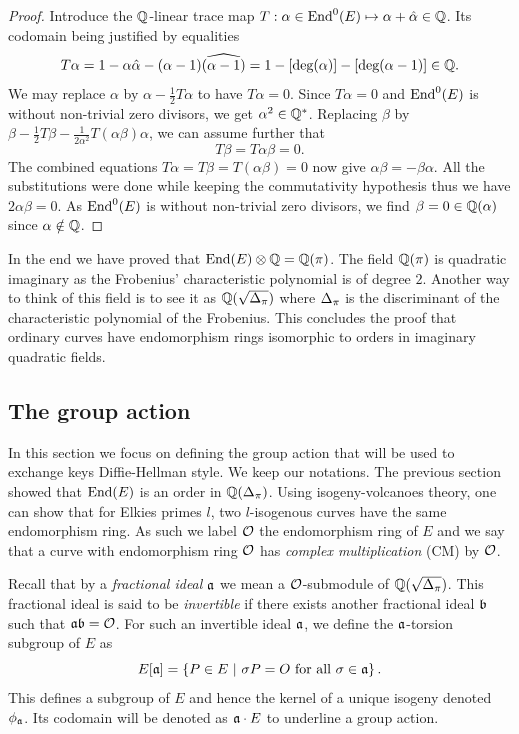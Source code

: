 \documentclass[../main/main.tex]{subfiles}
\begin{document}
\begin{proof}
	Introduce the $\mathbb{Q}$-linear trace map $T:\alpha\in\text{End}^0(E) \mapsto \alpha + \hat{\alpha}\in\mathbb{Q}$.
	Its codomain being justified by equalities
	\[T\alpha = 1 - \alpha\hat{\alpha} -(\alpha-1)\widehat{(\alpha-1)} = 1-[\text{deg}(\alpha)] - [\text{deg}(\alpha-1)]\in\mathbb{Q}.\]
	We may replace $\alpha$ by $\alpha-\frac{1}{2}T\alpha$ to have $T\alpha = 0$.
	Since $T\alpha=0$ and $\text{End}^0(E)$ is without non-trivial zero divisors, we get $\alpha^2\in\mathbb{Q}^{*}$.
	Replacing $\beta$ by $\beta-\frac{1}{2}T\beta-\frac{1}{2\alpha^2}T(\alpha\beta)\alpha$, we can assume further that
	\[
		T\beta = T\alpha\beta = 0.
	\]
	The combined equations $T\alpha=T\beta=T(\alpha\beta)=0$ now give $\alpha\beta = -\beta\alpha$.
	All the substitutions were done while keeping the commutativity hypothesis thus we have $2\alpha\beta=0$.
	As $\text{End}^0(E)$ is without non-trivial zero divisors, we find $\beta=0\in\mathbb{Q}(\alpha)$ since $\alpha\notin\mathbb{Q}$.
\end{proof}
In the end we have proved that $\text{End}(E)\otimes\mathbb{Q} = \mathbb{Q}(\pi)$.
The field $\mathbb{Q}(\pi)$ is quadratic imaginary as the Frobenius' characteristic polynomial is of degree $2$.
Another way to think of this field is to see it as $\mathbb{Q}(\sqrt{\Delta_{\pi}})$ where $\Delta_{\pi}$ is the discriminant of the characteristic polynomial of the Frobenius.
This concludes the proof that ordinary curves have endomorphism rings isomorphic to orders in imaginary quadratic fields.

\subsection{The group action}
In this section we focus on defining the group action that will be used to exchange keys Diffie-Hellman style.
We keep our notations.
The previous section showed that $\text{End}(E)$ is an order in $\mathbb{Q}(\Delta_{\pi})$.
Using isogeny-volcanoes theory, one can show that for Elkies primes $l$, two $l$-isogenous curves have the same endomorphism ring.
As such we label $\mathcal{O}$ the endomorphism ring of $E$ and we say that a curve with endomorphism ring $\mathcal{O}$ has \textit{complex multiplication} (CM) by $\mathcal{O}$.

Recall that by a \textit{fractional ideal} $\mathfrak{a}$ we mean a $\mathcal{O}$-submodule of $\mathbb{Q}(\sqrt{\Delta_{\pi}})$.
This fractional ideal is said to be \textit{invertible} if there exists another fractional ideal $\mathfrak{b}$ such that $\mathfrak{a}\mathfrak{b} = \mathcal{O}$.
For such an invertible ideal $\mathfrak{a}$, we define the $\mathfrak{a}$-torsion subgroup of $E$ as
\[
	E[\mathfrak{a}] = \left\{ P\in E\ |\ \sigma P = O \text{ for all } \sigma\in\mathfrak{a}\right\}.
\]
This defines a subgroup of $E$ and hence the kernel of a unique isogeny denoted $\phi_{\mathfrak{a}}$.
Its codomain will be denoted as $\mathfrak{a}\cdot E$ to underline a group action.
\end{document}

